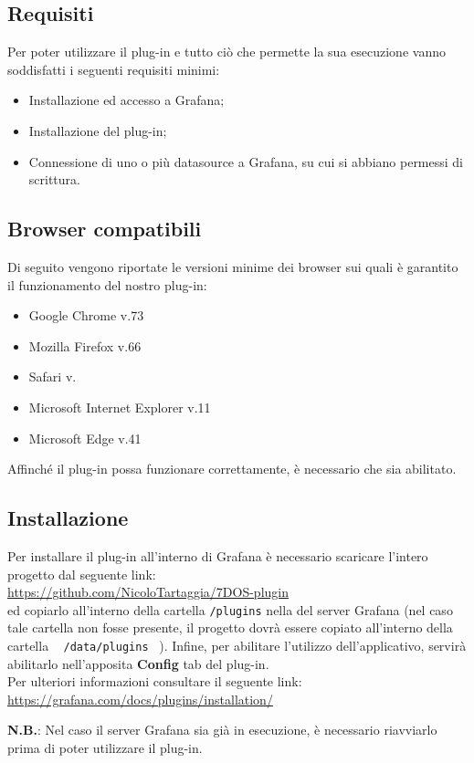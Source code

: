 \subsection{Requisiti}
Per poter utilizzare il plug-in e tutto ciò che permette la sua esecuzione vanno soddisfatti i seguenti requisiti minimi:
\begin{itemize}
	\item{Installazione ed accesso a Grafana;}
	\item{Installazione del plug-in;}
	\item{Connessione di uno o più datasource a Grafana, su cui si abbiano permessi di scrittura.}
\end{itemize}
\subsection{Browser compatibili}
Di seguito vengono riportate le versioni minime dei browser sui quali è garantito il funzionamento del nostro plug-in:
\begin{itemize}
	\item{Google Chrome v.73}
	\item{Mozilla Firefox v.66}
	\item{Safari v.}
	\item{Microsoft Internet Explorer v.11}
	\item{Microsoft Edge v.41} \\
\end{itemize}
Affinché il plug-in possa funzionare correttamente, è necessario che  sia abilitato.
\subsection{Installazione}
Per installare il plug-in all'interno di Grafana è necessario scaricare l'intero progetto dal seguente link: \\[0.2cm]
\hspace*{10mm}\url{https://github.com/NicoloTartaggia/7DOS-plugin}\\[0.2cm]
ed copiarlo all'interno della cartella \texttt{/plugins} nella  del server Grafana (nel caso tale cartella non fosse presente, il progetto dovrà essere copiato all'interno della cartella ~ \texttt{/data/plugins} ~).
Infine, per abilitare l'utilizzo dell'applicativo, servirà abilitarlo nell'apposita \textbf{Config} tab del plug-in.\\
Per ulteriori informazioni consultare il seguente link:\\[0.2cm]
\hspace*{10mm}
\url{https://grafana.com/docs/plugins/installation/}

\textbf{N.B.}: Nel caso il server Grafana sia già in esecuzione, è necessario riavviarlo prima di poter utilizzare il plug-in.
\pagebreak
